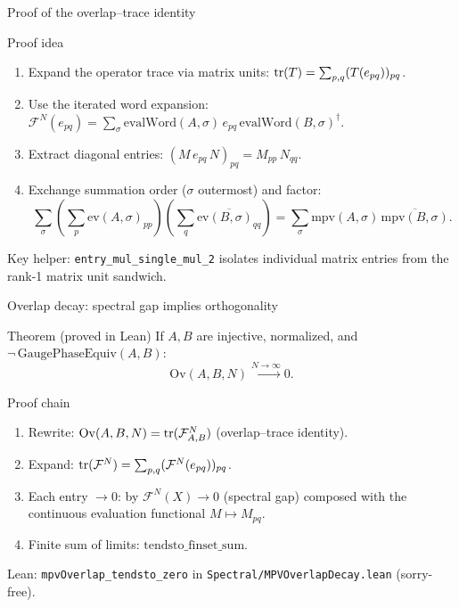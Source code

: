 \documentclass[aspectratio=169,10pt]{beamer}
\newcommand{\cF}{\mathcal{F}}
\newcommand{\Ov}{\mathrm{Ov}}
\begin{document}
\begin{frame}{Proof of the overlap--trace identity}
    \vspace{-0.6em}

    \begin{block}{Proof idea}
        \begin{enumerate}\itemsep0.2em
            \item Expand the operator trace via matrix units:
                  $\mathrm{tr}(T) = \sum_{p,q} (T(e_{pq}))_{pq}$.
            \item Use the iterated word expansion:
                  $\cF^N(e_{pq}) = \sum_\sigma \mathrm{evalWord}(A,\sigma)\,e_{pq}\, \mathrm{evalWord}(B,\sigma)^\dagger$.
            \item Extract diagonal entries:
                  $(M\,e_{pq}\,N)_{pq} = M_{pp}\,N_{qq}$.
            \item Exchange summation order ($\sigma$ outermost) and factor:
                  \[
                      \sum_\sigma \left(\sum_p \mathrm{ev}(A,\sigma)_{pp}\right)
                      \left(\sum_q \overline{\mathrm{ev}(B,\sigma)_{qq}}\right)
                      = \sum_\sigma \mathrm{mpv}(A,\sigma)\, \overline{\mathrm{mpv}(B,\sigma)}.
                  \]
        \end{enumerate}
    \end{block}

    \textcolor{dimwhite}{\footnotesize Key helper: \texttt{entry\_mul\_single\_mul\_2} isolates individual matrix entries
        from the rank-1 matrix unit sandwich.}
\end{frame}

\begin{frame}{Overlap decay: spectral gap implies orthogonality}
    \vspace{-0.6em}

    \begin{block}{Theorem (proved in Lean)}
        If $A,B$ are injective, normalized, and $\lnot\,\mathrm{GaugePhaseEquiv}(A,B)$:
        \[
            \Ov(A,B,N) \xrightarrow{N\to\infty}  0.
        \]
    \end{block}

    \begin{block}{Proof chain}
        \begin{enumerate}\itemsep0.15em
            \item Rewrite: $\Ov(A,B,N) = \tr(\cF_{A,B}^N)$ (overlap--trace identity).
            \item Expand: $\tr(\cF^N) = \sum_{p,q} (\cF^N(e_{pq}))_{pq}$.
            \item Each entry $\to 0$: by $\cF^N(X)\to 0$ (spectral gap) composed with the
                  continuous evaluation functional $M\mapsto M_{pq}$.
            \item Finite sum of limits: $\mathrm{tendsto\_finset\_sum}$.
        \end{enumerate}
    \end{block}

    \textcolor{dimwhite}{\footnotesize Lean: \texttt{mpvOverlap\_tendsto\_zero} in \texttt{Spectral/MPVOverlapDecay.lean} (sorry-free).}
\end{frame}
\end{document}
